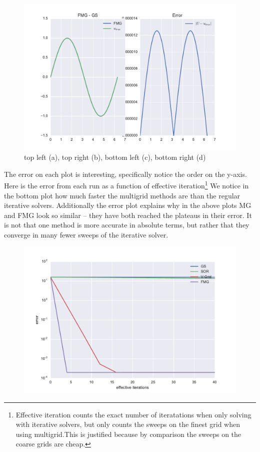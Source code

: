 \documentclass[pdftex,12pt,a4paper]{article}
\begin{document}
\begin{figure}[h]
            \includegraphics[scale=.4]{../plots/fmg_sol_1d.pdf}
            \caption{top left (a), top right (b), bottom left (c), bottom right (d)}
        \end{figure}

        The error on each plot is interesting, specifically notice the order on the y-axis. Here is the error from each run as a function of effective iteration\footnote{Effective iteration counts the exact number of iteratations when only solving with iterative solvers, but only counts the sweeps on the finest grid when using multigrid.This is justified because by comparison the sweeps on the coarse grids are cheap.} We notice in the bottom plot how much faster the multigrid methods are than the regular iterative solvers. Additionally the error plot explains why in the above plots MG and FMG look so similar -- they have both reached the plateaus in their error. It is not that one method is more accurate in absolute terms, but rather that they converge in many fewer sweeps of the iterative solver.
        \begin{figure}[h]
            \centering
            \includegraphics[scale=.75]{../plots/error_1d.pdf}
        \end{figure}      
\end{document}
